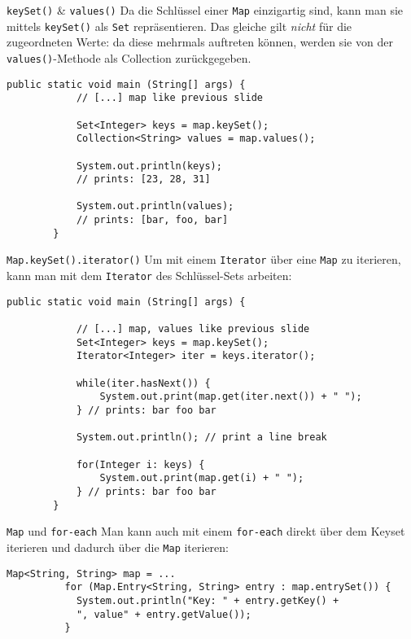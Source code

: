\begin{frame}[fragile]{\texttt{keySet()} \& \texttt{values()}}
    Da die Schlüssel einer \texttt{Map} einzigartig sind, kann man sie mittels \texttt{keySet()} als \texttt{Set} repräsentieren.
    Das gleiche gilt \emph{nicht} für die zugeordneten Werte: da diese mehrmals auftreten können, werden sie von der \texttt{values()}-Methode als Collection zurückgegeben.
    \begin{lstlisting}[gobble=8,basicstyle=\ttfamily\scriptsize]
        public static void main (String[] args) {
            // [...] map like previous slide

            Set<Integer> keys = map.keySet();
            Collection<String> values = map.values();

            System.out.println(keys);
            // prints: [23, 28, 31]

            System.out.println(values);
            // prints: [bar, foo, bar]
        }
    \end{lstlisting}
\end{frame}

\begin{frame}[fragile]{\texttt{Map.keySet().iterator()}}
    Um mit einem \texttt{Iterator} über eine \texttt{Map} zu iterieren, kann man mit dem \texttt{Iterator} des Schlüssel-Sets arbeiten:
    \begin{lstlisting}[gobble=8,basicstyle=\ttfamily\scriptsize]
        public static void main (String[] args) {

            // [...] map, values like previous slide
            Set<Integer> keys = map.keySet();
            Iterator<Integer> iter = keys.iterator();

            while(iter.hasNext()) {
                System.out.print(map.get(iter.next()) + " ");
            } // prints: bar foo bar

            System.out.println(); // print a line break

            for(Integer i: keys) {
                System.out.print(map.get(i) + " ");
            } // prints: bar foo bar
        }
    \end{lstlisting}
\end{frame}

\begin{frame}[fragile]{\texttt{Map} und \texttt{for-each}}
    Man kann auch mit einem \texttt{for-each} direkt über dem Keyset iterieren und dadurch über die \texttt{Map} iterieren:
    \begin{lstlisting}[gobble=8]
          Map<String, String> map = ...
          for (Map.Entry<String, String> entry : map.entrySet()) {
            System.out.println("Key: " + entry.getKey() +
            ", value" + entry.getValue());
          }
    \end{lstlisting}
\end{frame}

